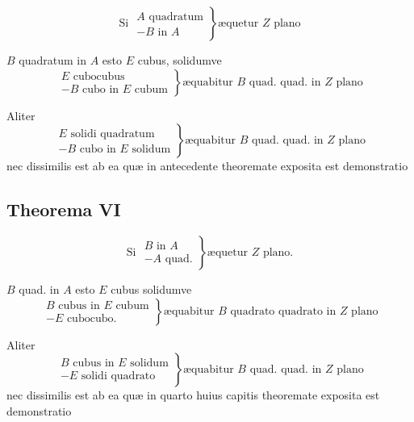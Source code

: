 \documentclass[11pt,a4paper]{article}
\begin{document}
\[ \text{Si } \left.\begin{array}{l} A \text{ quadratum} \\ - B \text{ in } A \end{array}\right\} \text{æquetur } Z \text{ plano} \]

$B$ quadratum in $A$ esto $E$ cubus, solidumve
\[ \left.\begin{array}{l} E \text{ cubocubus} \\ - B \text{ cubo in } E \text{ cubum} \end{array}\right\} \text{æquabitur } B \text{ quad. quad. in } Z \text{ plano} \]

Aliter
\[ \left.\begin{array}{l} E \text{ solidi quadratum} \\ - B \text{ cubo in } E \text{ solidum} \end{array}\right\} \text{æquabitur } B \text{ quad. quad. in } Z \text{ plano} \]
nec dissimilis est ab ea quæ in antecedente theoremate exposita est demonstratio

\subsection*{Theorema VI}

\[ \text{Si } \left.\begin{array}{l} B \text{ in } A \\ - A \text{ quad.} \end{array}\right\} \text{æquetur } Z \text{ plano.} \]

$B$ quad. in $A$ esto $E$ cubus solidumve
\[ \left.\begin{array}{l} B \text{ cubus in } E \text{ cubum} \\ - E \text{ cubocubo.} \end{array}\right\} \text{æquabitur } B \text{ quadrato quadrato in } Z \text{ plano} \]

Aliter
\[ \left.\begin{array}{l} B \text{ cubus in } E \text{ solidum} \\ - E \text{ solidi quadrato} \end{array}\right\} \text{æquabitur } B \text{ quad. quad. in } Z \text{ plano} \]
nec dissimilis est ab ea quæ in quarto huius capitis theoremate exposita est demonstratio

\end{document}

